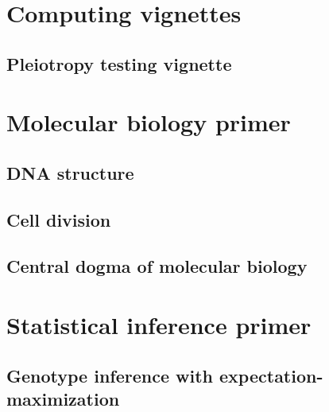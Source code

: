 \documentclass[oneside]{book}\usepackage[]{graphicx}\usepackage[]{color}
\begin{document}

\chapter{Computing vignettes}


\section{Pleiotropy testing vignette}




\printbibliography



\newpage
\begin{appendices}
\appendixpage

\chapter{Molecular biology primer}\label{sec:bio-primer}

\section{DNA structure}\label{sec:dna-structure}
\section{Cell division}\label{sec:cell-division}

\section{Central dogma of molecular biology}\label{sec:central-dogma}



\chapter{Statistical inference primer}\label{sec:stat-primer}




\section{Genotype inference with expectation-maximization}\label{sec:genotypes-em}









\end{appendices}
\end{document}
